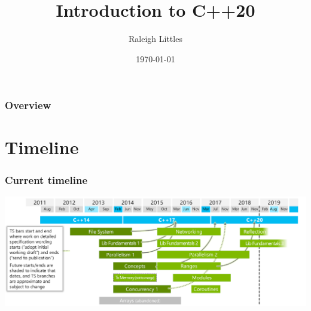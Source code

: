 \documentclass{beamer}
\title[Intro to C++20]{Introduction to C++20} %
\author{Raleigh Littles} %
\institute[Karl Storz Imaging] %
{
 \\ %
\medskip
\textit{} %
}
\date{\today} %
\begin{document}
\begin{frame}
\titlepage %
\end{frame}

\begin{frame}
\frametitle{Overview} %
\tableofcontents %
\end{frame}


\section{Timeline} %


\begin{frame}
\frametitle{Current timeline}

\includegraphics[width=\textwidth,height=\textheight,keepaspectratio]{timeline}

\end{frame}
\end{document}
